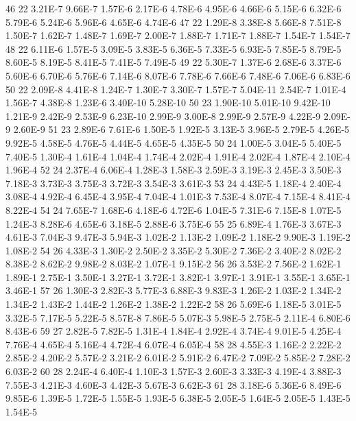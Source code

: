     46 22	3.21E-7 	9.66E-7 	1.57E-6 	2.17E-6 	4.78E-6 	4.95E-6 	4.66E-6 	5.15E-6 	6.32E-6 	5.79E-6 	5.24E-6 	5.96E-6 	4.65E-6 	4.74E-6
    47 22	1.29E-8 	3.38E-8 	5.66E-8 	7.51E-8 	1.50E-7 	1.62E-7 	1.48E-7 	1.69E-7 	2.00E-7 	1.88E-7 	1.71E-7 	1.88E-7 	1.54E-7 	1.54E-7
    48 22	6.11E-6 	1.57E-5 	3.09E-5 	3.83E-5 	6.36E-5 	7.33E-5 	6.93E-5 	7.85E-5 	8.79E-5 	8.60E-5 	8.19E-5 	8.41E-5 	7.41E-5 	7.49E-5
    49 22	5.30E-7 	1.37E-6 	2.68E-6 	3.37E-6 	5.60E-6 	6.70E-6 	5.76E-6 	7.14E-6 	8.07E-6 	7.78E-6 	7.66E-6 	7.48E-6 	7.06E-6 	6.83E-6
    50 22	2.09E-8 	4.41E-8 	1.24E-7 	1.30E-7 	3.30E-7 	1.57E-7 	5.04E-11 	2.54E-7 	1.01E-4 	1.56E-7 	4.38E-8 	1.23E-6 	3.40E-10 	5.28E-10
    50 23 	1.90E-10 	5.01E-10 	9.42E-10 	1.21E-9 	2.42E-9 	2.53E-9 	6.23E-10 	2.99E-9 	3.00E-8 	2.99E-9 	2.57E-9 	4.22E-9 	2.09E-9 	2.60E-9
    51 23 	2.89E-6 	7.61E-6 	1.50E-5 	1.92E-5 	3.13E-5 	3.96E-5 	2.79E-5 	4.26E-5 	9.92E-5 	4.58E-5 	4.76E-5 	4.44E-5 	4.65E-5 	4.35E-5
    50 24	1.00E-5 	3.04E-5 	5.40E-5 	7.40E-5 	1.30E-4 	1.61E-4 	1.04E-4 	1.74E-4 	2.02E-4 	1.91E-4 	2.02E-4 	1.87E-4 	2.10E-4 	1.96E-4
    52 24	2.37E-4 	6.06E-4 	1.28E-3 	1.58E-3 	2.59E-3 	3.19E-3 	2.45E-3 	3.50E-3 	7.18E-3 	3.73E-3 	3.75E-3 	3.72E-3 	3.54E-3 	3.61E-3
    53 24	4.43E-5 	1.18E-4 	2.40E-4 	3.08E-4 	4.92E-4 	6.45E-4 	3.95E-4 	7.04E-4 	1.01E-3 	7.53E-4 	8.07E-4 	7.15E-4 	8.41E-4 	8.22E-4
    54 24	7.65E-7 	1.68E-6 	4.18E-6 	4.72E-6 	1.04E-5 	7.31E-6 	7.15E-8 	1.07E-5 	1.24E-3 	8.28E-6 	4.65E-6 	3.18E-5 	2.88E-6 	3.75E-6
    55 25	6.89E-4 	1.76E-3 	3.67E-3 	4.61E-3 	7.04E-3 	9.47E-3 	5.94E-3 	1.02E-2 	1.13E-2 	1.09E-2 	1.18E-2 	9.90E-3 	1.19E-2 	1.08E-2
    54 26	4.33E-3 	1.30E-2 	2.50E-2 	3.35E-2 	5.30E-2 	7.36E-2 	3.40E-2 	8.02E-2 	8.38E-2 	8.62E-2 	9.98E-2 	8.03E-2 	1.07E-1 	9.15E-2
    56 26	3.53E-2 	7.56E-2 	1.62E-1 	1.89E-1 	2.75E-1 	3.50E-1 	3.27E-1 	3.72E-1 	3.82E-1 	3.97E-1 	3.91E-1 	3.55E-1 	3.65E-1 	3.46E-1
    57 26	1.30E-3 	2.82E-3 	5.77E-3 	6.88E-3 	9.83E-3 	1.26E-2 	1.03E-2 	1.34E-2 	1.34E-2 	1.43E-2 	1.44E-2 	1.26E-2 	1.38E-2 	1.22E-2
    58 26	5.69E-6 	1.18E-5 	3.01E-5 	3.32E-5 	7.17E-5 	5.22E-5 	8.57E-8 	7.86E-5 	5.07E-3 	5.98E-5 	2.75E-5 	2.11E-4 	6.80E-6 	8.43E-6
    59 27	2.82E-5 	7.82E-5 	1.31E-4 	1.84E-4 	2.92E-4 	3.74E-4 	9.01E-5 	4.25E-4 	7.76E-4 	4.65E-4 	5.16E-4 	4.72E-4 	6.07E-4 	6.05E-4
    58 28	4.55E-3 	1.16E-2 	2.22E-2 	2.85E-2 	4.20E-2 	5.57E-2 	3.21E-2 	6.01E-2 	5.91E-2 	6.47E-2 	7.09E-2 	5.85E-2 	7.28E-2 	6.03E-2
    60 28	2.24E-4 	6.40E-4 	1.10E-3 	1.57E-3 	2.60E-3 	3.33E-3 	4.19E-4 	3.88E-3 	7.55E-3 	4.21E-3 	4.60E-3 	4.42E-3 	5.67E-3 	6.62E-3
    61 28	3.18E-6 	5.36E-6 	8.49E-6 	9.85E-6 	1.39E-5 	1.72E-5 	1.55E-5 	1.93E-5 	6.38E-5 	2.05E-5 	1.64E-5 	2.05E-5 	1.43E-5 	1.54E-5
